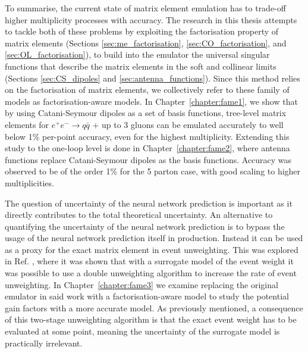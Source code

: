 \documentclass[main.tex]{subfiles}
\begin{document}
    To summarise, the current state of matrix element
    emulation has to trade-off higher multiplicity processes
    with accuracy. The research in this thesis attempts to
    tackle both of these problems by exploiting the factorisation
    property of matrix elements (Sections \ref{sec:me_factorisation},
    \ref{sec:CO_factorisation}, and \ref{sec:OL_factorisation}),
    to build into the emulator the universal singular functions
    that describe the matrix elements in the soft and collinear limits
    (Sections \ref{sec:CS_dipoles} and \ref{sec:antenna_functions}).
    Since this method relies on the factorisation of matrix
    elements, we collectively refer to these family of models
    as factorisation-aware models.
    In Chapter~\ref{chapter:fame1}, we show that by using
    Catani-Seymour dipoles as a set of basis functions, tree-level
    matrix elements for $e^{+}e^{-} \rightarrow q \bar{q}$ + up to 3 gluons
    can be emulated accurately to well below 1\% per-point accuracy,
    even for the highest multiplicity. Extending this study
    to the one-loop level is done in Chapter~\ref{chapter:fame2},
    where antenna functions replace Catani-Seymour dipoles as
    the basis functions. Accuracy was observed to be of the
    order 1\% for the 5 parton case, with good scaling
    to higher multiplicities.

    The question of uncertainty of the neural network
    prediction is important as it directly contributes to the total
    theoretical uncertainty. An alternative to quantifying
    the uncertainty of the neural network prediction is to
    bypass the usage of the neural network prediction itself
    in production.
    Instead it can be used as a proxy for the exact matrix
    element in event unweighting. This was explored in
    Ref. \cite{Danziger:2021eeg},
    where it was shown that with a surrogate model of the event
    weight it was possible to use a double unweighting
    algorithm to increase the rate of event unweighting.
    In Chapter~\ref{chapter:fame3} we examine replacing
    the original emulator in said work with a factorisation-aware
    model to study the potential gain factors with a more
    accurate model. As previously mentioned, a consequence of
    this two-stage unweighting
    algorithm is that the exact event weight has to be evaluated
    at some point, meaning the uncertainty of the surrogate
    model is practically irrelevant.
\end{document}
